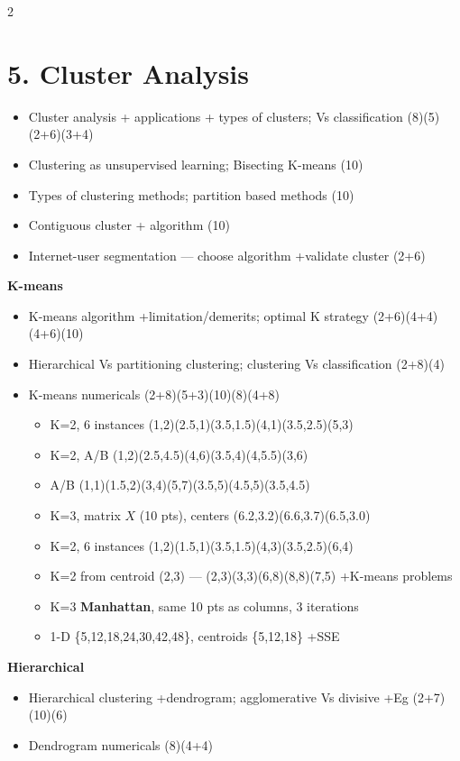 \documentclass[10pt]{article}
\begin{document}
\begin{multicols}{2}
\section*{5. Cluster Analysis}
\begin{itemize}
  \item Cluster analysis + applications + types of clusters; Vs classification \hfill (8)(5)(2+6)(3+4)
  \item Clustering as unsupervised learning; Bisecting K-means \hfill (10)
  \item Types of clustering methods; partition based methods \hfill (10)
  \item Contiguous cluster + algorithm \hfill (10)
  \item Internet-user segmentation --- choose algorithm +validate cluster \hfill (2+6)
\end{itemize}
\textbf{K-means}
\begin{itemize}
  \item K-means algorithm +limitation/demerits; optimal K strategy \hfill (2+6)(4+4)(4+6)(10)
  \item Hierarchical Vs partitioning clustering; clustering Vs classification \hfill (2+8)(4)
  \item K-means numericals \hfill (2+8)(5+3)(10)(8)(4+8)
    \begin{itemize}
      \item K=2, 6 instances (1,2)(2.5,1)(3.5,1.5)(4,1)(3.5,2.5)(5,3)
      \item K=2, A/B (1,2)(2.5,4.5)(4,6)(3.5,4)(4,5.5)(3,6)
      \item A/B (1,1)(1.5,2)(3,4)(5,7)(3.5,5)(4.5,5)(3.5,4.5)
      \item K=3, matrix $X$ (10 pts), centers (6.2,3.2)(6.6,3.7)(6.5,3.0)
      \item K=2, 6 instances (1,2)(1.5,1)(3.5,1.5)(4,3)(3.5,2.5)(6,4)
      \item K=2 from centroid (2,3) --- (2,3)(3,3)(6,8)(8,8)(7,5) +K-means problems
      \item K=3 \textbf{Manhattan}, same 10 pts as columns, 3 iterations
      \item 1-D \{5,12,18,24,30,42,48\}, centroids \{5,12,18\} +SSE
    \end{itemize}
\end{itemize}
\textbf{Hierarchical}
\begin{itemize}
  \item Hierarchical clustering +dendrogram; agglomerative Vs divisive +Eg \hfill (2+7)(10)(6)
  \item Dendrogram numericals \hfill (8)(4+4)

\end{itemize}
\end{multicols}
\end{document}
